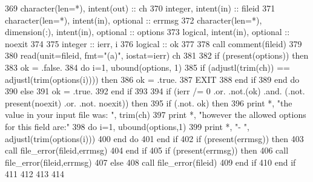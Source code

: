 \begin{DoxyCode}
369       \textcolor{keywordtype}{character(len=*)}, \textcolor{keywordtype}{intent(out)} :: ch
370       \textcolor{keywordtype}{integer}, \textcolor{keywordtype}{intent(in)} :: fileid
371       \textcolor{keywordtype}{character(len=*)}, \textcolor{keywordtype}{intent(in)}, \textcolor{keywordtype}{optional} :: errmsg
372       \textcolor{keywordtype}{character(len=*)}, \textcolor{keywordtype}{dimension(:)}, \textcolor{keywordtype}{intent(in)}, \textcolor{keywordtype}{optional} :: options
373       \textcolor{keywordtype}{logical}, \textcolor{keywordtype}{intent(in)}, \textcolor{keywordtype}{optional} :: noexit
374 
375       \textcolor{keywordtype}{integer} :: ierr, i
376       \textcolor{keywordtype}{logical} :: ok
377       
378       \textcolor{keyword}{call }comment(fileid)
379       
380       \textcolor{keyword}{read}(unit=fileid, fmt=\textcolor{stringliteral}{"(a)"}, iostat=ierr) ch
381       
382       \textcolor{keywordflow}{if} (\textcolor{keyword}{present}(options)) \textcolor{keywordflow}{then}
383         ok = .false.
384         \textcolor{keywordflow}{do} i=1, ubound(options, 1)
385           \textcolor{keywordflow}{if} (adjustl(trim(ch)) == adjustl(trim(options(i)))) \textcolor{keywordflow}{then}
386             ok = .true.
387             \textcolor{keywordflow}{EXIT}
388 \textcolor{keywordflow}{          end if}
389 \textcolor{keywordflow}{        end do}
390       \textcolor{keywordflow}{else}
391         ok = .true.     
392 \textcolor{keywordflow}{      end if}
393       
394       \textcolor{keywordflow}{if} (ierr /= 0 .or. .not.(ok) .and. (.not. \textcolor{keyword}{present}(noexit) .or. .not. noexit)) \textcolor{keywordflow}{then}
395         \textcolor{keywordflow}{if} (.not. ok) \textcolor{keywordflow}{then}
396           print *, \textcolor{stringliteral}{"the value in your input file was: "}, trim(ch)
397           print *, \textcolor{stringliteral}{"however the allowed options for this field are:"}
398           \textcolor{keywordflow}{do} i=1, ubound(options,1)
399             print *, \textcolor{stringliteral}{"-  "}, adjustl(trim(options(i)))
400 \textcolor{keywordflow}{          end do}
401 \textcolor{keywordflow}{        end if}
402         \textcolor{keywordflow}{if} (\textcolor{keyword}{present}(errmsg)) \textcolor{keywordflow}{then}
403           \textcolor{keyword}{call }file_error(fileid,errmsg)
404 \textcolor{keywordflow}{        end if}
405         \textcolor{keywordflow}{if} (\textcolor{keyword}{present}(errmsg)) \textcolor{keywordflow}{then}
406           \textcolor{keyword}{call }file_error(fileid,errmsg)
407         \textcolor{keywordflow}{else}
408           \textcolor{keyword}{call }file_error(fileid)
409 \textcolor{keywordflow}{        end if}
410 \textcolor{keywordflow}{      end if}
411       
412       
413       
414       
\end{DoxyCode}


